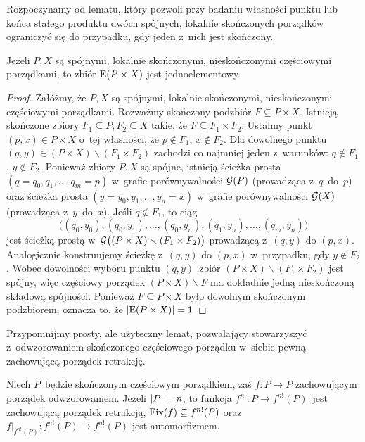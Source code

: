 Rozpoczynamy od lematu, który pozwoli przy badaniu własności punktu lub końca stałego produktu dwóch spójnych, lokalnie skończonych porządków ograniczyć się do przypadku, gdy jeden z~nich jest skończony.
\begin{lem}\label{lem-produkt_nieskonczonych_ma_jeden_koniec}
Jeżeli $P,X$ są spójnymi, lokalnie skończonymi, nieskończonymi częściowymi porządkami, to zbiór $\mathrm{E}(P\times X)$ jest jednoelementowy.
\end{lem}
\begin{proof}
Załóżmy, że $P,X$ są spójnymi, lokalnie skończonymi, nieskończonymi częściowymi porządkami. Rozważmy skończony podzbiór $F\subseteq P\times X$. Istnieją skończone zbiory $F_1\subseteq P, F_2\subseteq X$ takie, że $F\subseteq F_1\times F_2$. Ustalmy punkt $(p,x)\in P\times X$ o~tej własności, że $p\not\in F_1$, $x\not\in F_2$. Dla dowolnego punktu $(q,y)\in (P\times X)\smallsetminus (F_1\times F_2)$ zachodzi co najmniej jeden z~warunków: $q\not\in F_1$, $y\not\in F_2$. Ponieważ zbiory $P,X$ są spójne, istnieją ścieżka prosta $(q=q_0,q_1,\ldots,q_m=p)$ w~grafie porównywalności $\mathcal{G}(P)$ (prowadząca z~$q$~do~$p$) oraz ścieżka prosta $(y=y_0,y_1,\ldots,y_n=x)$ w~grafie porównywalności $\mathcal{G}(X)$ (prowadząca z~$y$~do~$x$). Jeśli $q\not\in F_1$, to ciąg \[\big((q_0,y_0),(q_0,y_1),\ldots,(q_0,y_n),(q_1,y_n),\ldots,(q_m,y_n)\big)\] jest ścieżką prostą w~$\mathcal{G}\bigl((P\times X)\smallsetminus (F_1\times F_2)\bigr)$ prowadzącą z~$(q,y)$ do $(p,x)$. Analogicznie konstruujemy ścieżkę z~$(q,y)$ do $(p,x)$ w~przypadku, gdy $y\not\in F_2$. Wobec dowolności wyboru punktu $(q,y)$~zbiór $(P\times X)\smallsetminus (F_1\times F_2)$ jest spójny, więc częściowy porządek $(P\times X)\smallsetminus F$ ma dokładnie jedną nieskończoną składową spójności. Ponieważ $F\subseteq P\times X$ było dowolnym skończonym podzbiorem, oznacza to, że $\left|\mathrm{E}(P\times X)\right|=1$
\end{proof}

Przypomnijmy prosty, ale użyteczny lemat, pozwalający stowarzyszyć z~odwzorowaniem skończonego częściowego porządku w~siebie pewną zachowującą porządek retrakcję.
\begin{lem}\label{lem-o_retrakcji_z_silnia}
Niech $P$~będzie skończonym częściowym porządkiem, zaś $f\colon P\to P$ zachowującym porządek odwzorowaniem. Jeżeli $\left|P\right|=n$, to funkcja $f^{n!}\colon P\to f^{n!}(P)$~jest zachowującą porządek retrakcją, $\operatorname{Fix}(f)\subseteq f^{n!}(P)$ oraz $f\big|_{f^{n!}(P)}\colon f^{n!}(P)\to f^{n!}(P)$ jest automorfizmem.
\end{lem}

